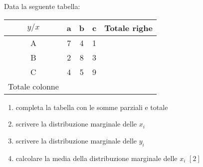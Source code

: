 

\subsubsection*{}

\begin{esercizio}
\label{ese:c_stat_001}
Data la seguente tabella:
\begin{center}
\setlength{\tabcolsep}{.8cm}
\begin{tabular}{|c|c|c|c|c|}
\hline
$y/x$ & a & b & c & Totale righe\\
\hline
A & 7 & 4 & 1 & \\
\hline
B & 2 & 8 & 3 & \\
\hline
C & 4 & 5 & 9 & \\
\hline
Totale colonne & & & & \\
\hline
\end{tabular}
\end{center}

\begin{enumerate}
\item completa la tabella con le somme parziali e totale
\item scrivere la distribuzione marginale delle $x_i$
\item scrivere la distribuzione marginale delle $y_i$
\item calcolare la media della distribuzione marginale delle $x_i$ 
\hfill $[2]$
\end{enumerate}
\end{esercizio}

